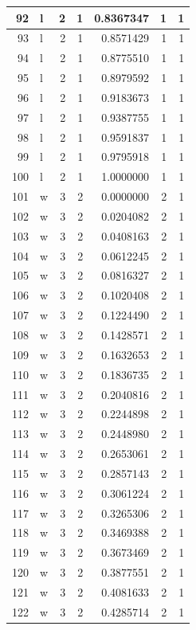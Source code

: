 \documentclass[
  letterpaper,
  DIV=11,
  numbers=noendperiod]{scrreprt}
\begin{document}
\begin{table}
\begin{tabular}[t]{r|l|r|r|r|r|r}
\hline
92 & l & 2 & 1 & 0.8367347 & 1 & 1\\
\hline
93 & l & 2 & 1 & 0.8571429 & 1 & 1\\
\hline
94 & l & 2 & 1 & 0.8775510 & 1 & 1\\
\hline
95 & l & 2 & 1 & 0.8979592 & 1 & 1\\
\hline
96 & l & 2 & 1 & 0.9183673 & 1 & 1\\
\hline
97 & l & 2 & 1 & 0.9387755 & 1 & 1\\
\hline
98 & l & 2 & 1 & 0.9591837 & 1 & 1\\
\hline
99 & l & 2 & 1 & 0.9795918 & 1 & 1\\
\hline
100 & l & 2 & 1 & 1.0000000 & 1 & 1\\
\hline
101 & w & 3 & 2 & 0.0000000 & 2 & 1\\
\hline
102 & w & 3 & 2 & 0.0204082 & 2 & 1\\
\hline
103 & w & 3 & 2 & 0.0408163 & 2 & 1\\
\hline
104 & w & 3 & 2 & 0.0612245 & 2 & 1\\
\hline
105 & w & 3 & 2 & 0.0816327 & 2 & 1\\
\hline
106 & w & 3 & 2 & 0.1020408 & 2 & 1\\
\hline
107 & w & 3 & 2 & 0.1224490 & 2 & 1\\
\hline
108 & w & 3 & 2 & 0.1428571 & 2 & 1\\
\hline
109 & w & 3 & 2 & 0.1632653 & 2 & 1\\
\hline
110 & w & 3 & 2 & 0.1836735 & 2 & 1\\
\hline
111 & w & 3 & 2 & 0.2040816 & 2 & 1\\
\hline
112 & w & 3 & 2 & 0.2244898 & 2 & 1\\
\hline
113 & w & 3 & 2 & 0.2448980 & 2 & 1\\
\hline
114 & w & 3 & 2 & 0.2653061 & 2 & 1\\
\hline
115 & w & 3 & 2 & 0.2857143 & 2 & 1\\
\hline
116 & w & 3 & 2 & 0.3061224 & 2 & 1\\
\hline
117 & w & 3 & 2 & 0.3265306 & 2 & 1\\
\hline
118 & w & 3 & 2 & 0.3469388 & 2 & 1\\
\hline
119 & w & 3 & 2 & 0.3673469 & 2 & 1\\
\hline
120 & w & 3 & 2 & 0.3877551 & 2 & 1\\
\hline
121 & w & 3 & 2 & 0.4081633 & 2 & 1\\
\hline
122 & w & 3 & 2 & 0.4285714 & 2 & 1\\

\end{tabular}
\end{table}
\end{document}

